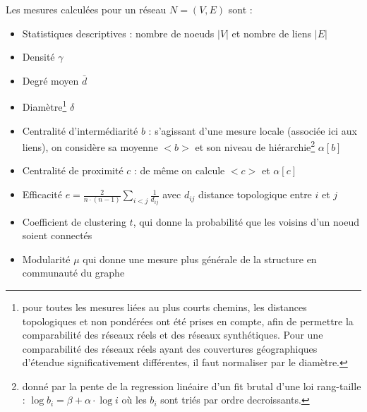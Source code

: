 Les mesures calculées pour un réseau $N=(V,E)$ sont :

\begin{itemize}
\item Statistiques descriptives : nombre de noeuds $\left|V\right|$ et nombre de liens $\left|E\right|$
\item Densité $\gamma$
\item Degré moyen $\bar{d}$
\item Diamètre\footnote{pour toutes les mesures liées au plus courts chemins, les distances topologiques et non pondérées ont été prises en compte, afin de permettre la comparabilité des réseaux réels et des réseaux synthétiques. Pour une comparabilité des réseaux réels ayant des couvertures géographiques d'étendue significativement différentes, il faut normaliser par le diamètre.} $\delta$
\item Centralité d'intermédiarité $b$ : s'agissant d'une mesure locale (associée ici aux liens), on considère sa moyenne $<b>$ et son niveau de hiérarchie\footnote{donné par la pente de la regression linéaire d'un fit brutal d'une loi rang-taille : $\log{b_i} = \beta + \alpha\cdot \log i$ où les $b_i$ sont triés par ordre decroissants.} $\alpha\left[b\right]$
\item Centralité de proximité $c$ : de même on calcule $<c>$ et $\alpha\left[c\right]$
\item Efficacité $e = \frac{2}{n\cdot (n-1)} \sum_{i<j} \frac{1}{d_{ij}}$ avec $d_{ij}$ distance topologique entre $i$ et $j$
\item Coefficient de clustering $t$, qui donne la probabilité que les voisins d'un noeud soient connectés
\item Modularité $\mu$ qui donne une mesure plus générale de la structure en communauté du graphe
\end{itemize}



